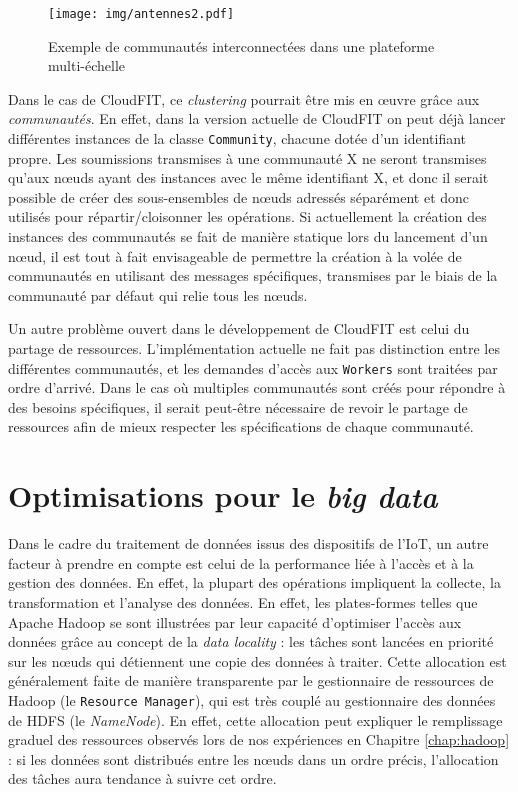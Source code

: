 \begin{figure}[!ht]
	\centering
	\texttt{[image: img/antennes2.pdf]}
	\caption{Exemple de communautés interconnectées dans une plateforme multi-échelle}
	\label{fig:antennes}
\end{figure}


Dans le cas de CloudFIT, ce \textit{clustering} pourrait être mis en {\oe}uvre grâce aux \textit{communautés}. En effet, dans la version actuelle de CloudFIT on peut déjà lancer différentes instances de la classe \texttt{Community}, chacune dotée d'un identifiant propre. Les soumissions transmises à une communauté X ne seront transmises qu'aux n{\oe}uds ayant des instances avec le même identifiant X, et donc il serait possible de créer des sous-ensembles de n{\oe}uds adressés séparément et donc utilisés pour répartir/cloisonner les opérations. Si actuellement la création des instances des communautés se fait de manière statique lors du lancement d'un n{\oe}ud, il est tout à fait envisageable de permettre la création à la volée de communautés en utilisant des messages spécifiques, transmises par le biais de la communauté par défaut qui relie tous les n{\oe}uds.  

Un autre problème ouvert dans le développement de CloudFIT est celui du partage de ressources. L'implémentation actuelle ne fait pas distinction entre les différentes communautés, et les demandes d'accès aux \texttt{Workers} sont traitées par ordre d'arrivé. Dans le cas où multiples communautés sont créés pour répondre à des besoins spécifiques, il serait peut-être nécessaire de revoir le partage de ressources afin de mieux respecter les spécifications de chaque communauté. 

 

\section{Optimisations pour le \textit{big data}\label{sec:datalocality}}
%
Dans le cadre du traitement de données issus des dispositifs de l'IoT, un autre facteur à prendre en compte est celui de la performance liée à l'accès et à la gestion des données. En effet, la plupart des opérations impliquent la collecte, la transformation et l'analyse des données. En effet, les plates-formes telles que Apache Hadoop se sont illustrées par leur capacité d'optimiser l'accès aux données grâce au concept de la \textit{data locality} : les tâches sont lancées en priorité sur les n{\oe}uds qui détiennent une copie des données à traiter. Cette allocation est généralement faite de manière transparente par le gestionnaire de ressources de Hadoop (le \texttt{Resource Manager}), qui est très couplé au gestionnaire des données de HDFS (le \textit{NameNode}). En effet, cette allocation peut expliquer le remplissage graduel des ressources observés lors de nos expériences en Chapitre \ref{chap:hadoop} : si les données sont distribués entre les n{\oe}uds dans un ordre précis, l'allocation des tâches aura tendance à suivre cet ordre.

